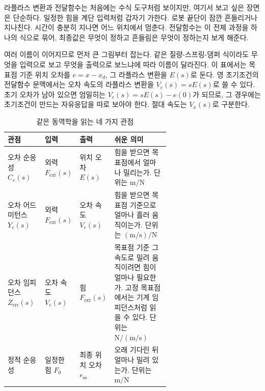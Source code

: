 라플라스 변환과 전달함수는 처음에는 수식 도구처럼 보이지만, 여기서 보고 싶은 장면은 단순하다.
일정한 힘을 계단 입력처럼 갑자기 가한다.
로봇 끝단이 잠깐 흔들리거나 지나친다.
시간이 충분히 지나면 어느 위치에서 멈춘다.
전달함수는 이 전체 과정을 하나의 식으로 묶어, 최종값은 무엇이 정하고 흔들림은 무엇이 정하는지 보게 해준다.

여러 이름이 이어지므로 먼저 큰 그림부터 잡는다.
같은 질량-스프링-댐퍼 식이라도 무엇을 입력으로 보고 무엇을 출력으로 보느냐에 따라 이름이 달라진다.
이 표에서는 목표점 기준 위치 오차를 $e=x-x_d$, 그 라플라스 변환을 $E(s)$로 둔다.
영 초기조건의 전달함수 문맥에서는 오차 속도의 라플라스 변환을 $V_e(s)=sE(s)$로 쓸 수 있다.
초기 오차가 남아 있으면 엄밀히는 $V_e(s)=sE(s)-e(0)$가 되므로, 그 경우에는 초기조건이 만드는 자유응답을 따로 보아야 한다.
절대 속도는 $V_x(s)$로 구분한다.

\begin{table}[!htbp]
  \centering
  \caption{같은 동역학을 읽는 네 가지 관점}
  \small
  \setlength{\tabcolsep}{4pt}
  \begin{tabularx}{\linewidth}{@{}>{\raggedright\arraybackslash}p{0.23\linewidth}>{\raggedright\arraybackslash}p{0.20\linewidth}>{\raggedright\arraybackslash}p{0.20\linewidth}>{\raggedright\arraybackslash}X@{}}
    \toprule
    관점 & 입력 & 출력 & 쉬운 의미 \\
    \midrule
    오차 순응성 $C_e(s)$ & 외력 $F_{\mathrm{ext}}(s)$ & 위치 오차 $E(s)$ & 힘을 받으면 목표점에서 얼마나 밀리는가. 단위는 $\mathrm{m/N}$ \\
    오차 어드미턴스 $Y_e(s)$ & 외력 $F_{\mathrm{ext}}(s)$ & 오차 속도 $V_e(s)$ & 힘을 받으면 목표점 기준으로 얼마나 흘러 움직이는가. 단위는 $(\mathrm{m/s})/\mathrm{N}$ \\
    오차 임피던스 $Z_{\mathrm{err}}(s)$ & 오차 속도 $V_e(s)$ & 힘 $F_{\mathrm{ext}}(s)$ & 목표점 기준 그 속도로 밀려 움직이려면 힘이 얼마나 필요한가. 고정 목표점에서는 기계 임피던스처럼 읽을 수 있다. 단위는 $\mathrm{N}/(\mathrm{m/s})$ \\
    정적 순응성 & 일정한 힘 $F_0$ & 최종 위치 오차 $e_{\mathrm{ss}}$ & 오래 기다린 뒤 얼마나 밀려 있는가. 단위는 $\mathrm{m/N}$ \\
    \bottomrule
  \end{tabularx}
\end{table}

